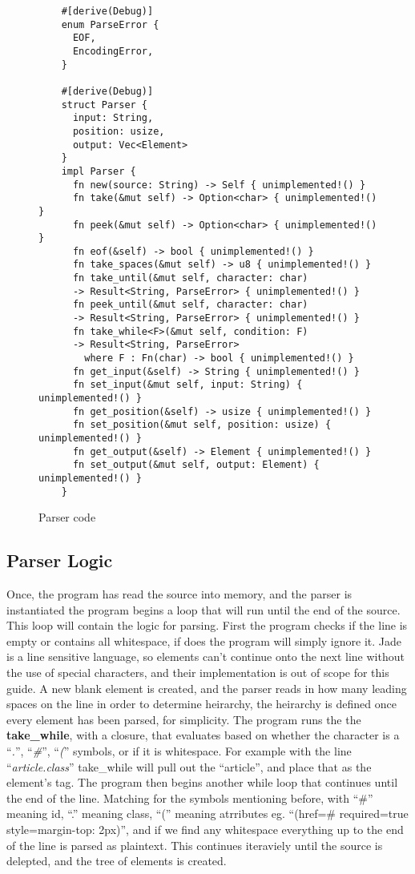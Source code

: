 \begin{figure}[ht!]
  \begin{verbatim}
    #[derive(Debug)]
    enum ParseError {
      EOF,
      EncodingError,
    }

    #[derive(Debug)]
    struct Parser {
      input: String,
      position: usize,
      output: Vec<Element>
    }
    impl Parser {
      fn new(source: String) -> Self { unimplemented!() }
      fn take(&mut self) -> Option<char> { unimplemented!() }
      fn peek(&mut self) -> Option<char> { unimplemented!() }
      fn eof(&self) -> bool { unimplemented!() }
      fn take_spaces(&mut self) -> u8 { unimplemented!() }
      fn take_until(&mut self, character: char) 
      -> Result<String, ParseError> { unimplemented!() }
      fn peek_until(&mut self, character: char) 
      -> Result<String, ParseError> { unimplemented!() }
      fn take_while<F>(&mut self, condition: F) 
      -> Result<String, ParseError> 
        where F : Fn(char) -> bool { unimplemented!() }
      fn get_input(&self) -> String { unimplemented!() }
      fn set_input(&mut self, input: String) { unimplemented!() }
      fn get_position(&self) -> usize { unimplemented!() }
      fn set_position(&mut self, position: usize) { unimplemented!() }
      fn get_output(&self) -> Element { unimplemented!() }
      fn set_output(&mut self, output: Element) { unimplemented!() }
    }
  \end{verbatim}
  \caption{Parser code}
\end{figure}
\newpage
\newpage
\subsection{Parser Logic}
Once, the program has read the source into memory, and the parser is instantiated the program begins a loop that will run until the end of the source. This loop will contain the logic for parsing. First the program checks if the line is empty or contains all whitespace, if does the program will simply ignore it. Jade is a line sensitive language, so elements can't continue onto the next line without the use of special characters, and their implementation is out of scope for this guide. A new blank element is created, and the parser reads in how many leading spaces on the line in order to determine heirarchy, the heirarchy is defined once every element has been parsed, for simplicity. The program runs the the \textbf{take\_while}, with a closure, that evaluates based on whether the character is a ``\textit{.}'', ``\textit{\#}'', ``\textit{(}'' symbols, or if it is whitespace. For example with the line ``\textit{article.class}'' take\_while will pull out the ``article'', and place that as the element's tag. The program then begins another while loop that continues until the end of the line. Matching for the symbols mentioning before, with ``\#'' meaning id, ``.'' meaning class, ``('' meaning atrributes eg. ``(href=\textquotedbl{}\#\textquotedbl{} required=\textquotedbl{}true\textquotedbl{} style=\textquotedbl{}margin-top: 2px\textquotedbl{})'', and if we find any whitespace everything up to the end of the line is parsed as plaintext. This continues iteraviely until the source is delepted, and the tree of elements is created.


